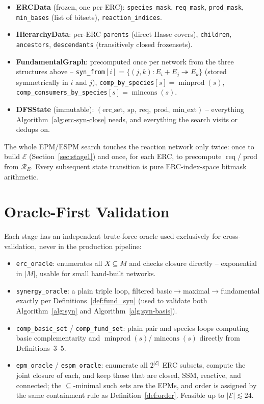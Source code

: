 \documentclass[11pt]{article}
\theoremstyle{plain}
\theoremstyle{remark}
\newcommand{\prods}{\operatorname{prod}}
\newcommand{\req}{\operatorname{req}}
\newcommand{\minprod}{\operatorname{minprod}}
\newcommand{\mincons}{\operatorname{mincons}}
\newcommand{\E}{\mathcal{E}}
\newcommand{\R}{\mathcal{R}}
\newcommand{\M}{M}
\begin{document}
\begin{itemize}
  \item \textbf{ERCData} (frozen, one per ERC): \texttt{species\_mask},
  \texttt{req\_mask}, \texttt{prod\_mask}, \texttt{min\_bases}
  (list of bitsets), \texttt{reaction\_indices}.
  \item \textbf{HierarchyData}: per-ERC \texttt{parents} (direct Hasse
  covers), \texttt{children}, \texttt{ancestors}, \texttt{descendants}
  (transitively closed frozensets).
  \item \textbf{FundamentalGraph}: precomputed once per network from the
  three structures above --
  \texttt{syn\_from}$[i]=\{(j,k):E_i+E_j\twoheadrightarrow E_k\}$
  (stored symmetrically in $i$ and $j$),
  \texttt{comp\_by\_species}$[s]=\minprod(s)$,
  \texttt{comp\_consumers\_by\_species}$[s]=\mincons(s)$.
  \item \textbf{DFSState} (immutable): $(\mathrm{erc\_set},\ \mathrm{sp},\
  \mathrm{req},\ \mathrm{prod},\ \mathrm{min\_ext})$ -- everything
  Algorithm~\ref{alg:erc-syn-close} needs, and everything the search
  visits or dedups on.
\end{itemize}

The whole EPM/ESPM search touches the reaction network only twice: once
to build $\E$ (Section~\ref{sec:stage1}) and once, for each ERC, to
precompute $\req$/$\prods$ from $\R_E$. Every subsequent state transition
is pure ERC-index-space bitmask arithmetic.

\section{Oracle-First Validation}\label{sec:oracle}

Each stage has an independent brute-force oracle used exclusively for
cross-validation, never in the production pipeline:

\begin{itemize}
  \item \texttt{erc\_oracle}: enumerates all $X\subseteq\M$ and checks
  closure directly -- exponential in $|\M|$, usable for small hand-built
  networks.
  \item \texttt{synergy\_oracle}: a plain triple loop, filtered
  basic$\to$maximal$\to$fundamental exactly per
  Definitions~\ref{def:fund_syn} (used to validate both
  Algorithm~\ref{alg:syn} and Algorithm~\ref{alg:syn-basis}).
  \item \texttt{comp\_basic\_set} / \texttt{comp\_fund\_set}: plain pair
  and species loops computing basic complementarity and
  $\minprod(s)$/$\mincons(s)$ directly from Definitions~3--5.
  \item \texttt{epm\_oracle} / \texttt{espm\_oracle}: enumerate all
  $2^{|\E|}$ ERC subsets, compute the joint closure of each, and keep
  those that are closed, SSM, reactive, and connected; the $\subseteq$-minimal
  such sets are the EPMs, and order is assigned by the same containment
  rule as Definition~\ref{def:order}. Feasible up to $|\E|\lesssim 24$.
\end{itemize}
\end{document}
